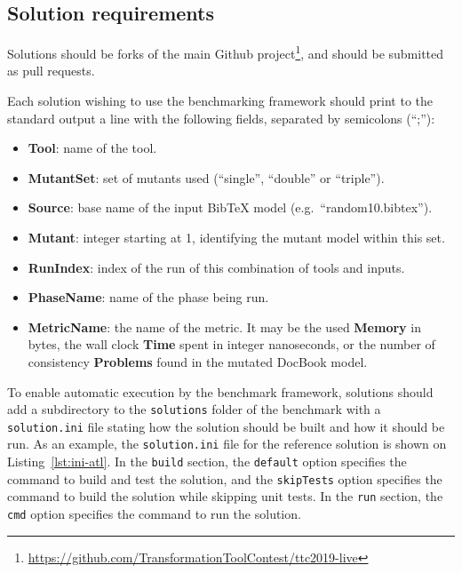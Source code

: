 \documentclass[a4paper]{scrartcl}
\newcommand*{\file}[1]{\texttt{#1}}
\begin{document}
\subsection{Solution requirements}
\label{sec:solut-requ}

Solutions should be forks of the main Github
project\footnote{\url{https://github.com/TransformationToolContest/ttc2019-live}},
and should be submitted as pull requests.

Each solution wishing to use the benchmarking framework should print to the
standard output a line with the following fields, separated by semicolons
(``;''):

\begin{itemize}
\item \textbf{Tool}: name of the tool.
\item \textbf{MutantSet}: set of mutants used (``single'', ``double'' or ``triple'').
\item \textbf{Source}: base name of the input BibTeX model (e.g.\ ``random10.bibtex'').
\item \textbf{Mutant}: integer starting at 1, identifying the mutant model within this set.
\item \textbf{RunIndex}: index of the run of this combination of tools and inputs.
\item \textbf{PhaseName}: name of the phase being run.
\item \textbf{MetricName}: the name of the metric. It may be the used
  \textbf{Memory} in bytes, the wall clock \textbf{Time} spent in integer
  nanoseconds, or the number of consistency \textbf{Problems} found in the
  mutated DocBook model.
\end{itemize}



To enable automatic execution by the benchmark framework, solutions should add a
subdirectory to the \file{solutions} folder of the benchmark with a
\file{solution.ini} file stating how the solution should be built and how it
should be run. As an example, the \file{solution.ini} file for the reference
solution is shown on Listing~\ref{lst:ini-atl}. In the \file{build} section, the
\file{default} option specifies the command to build and test the solution, and
the \file{skipTests} option specifies the command to build the solution while
skipping unit tests. In the \file{run} section, the \file{cmd} option specifies
the command to run the solution.
\end{document}
